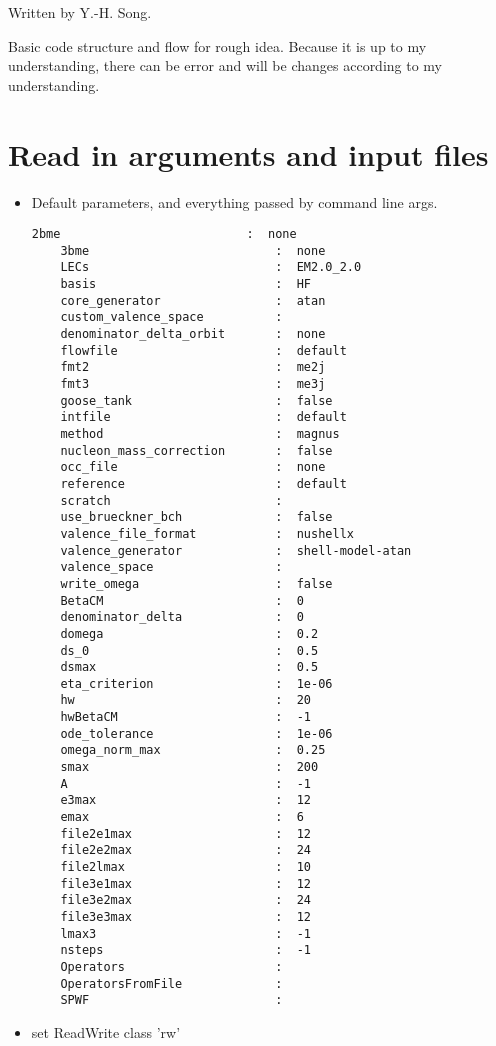 


Written by Y.-H. Song. 

Basic code structure and flow for rough idea. 
Because it is up to my understanding, there can be error
and will be changes according to my understanding. 

\section{Read in arguments and input files}
\begin{itemize}
 \item Default parameters, and everything passed by command line args.	
   \begin{lstlisting}[frame=single]
	2bme                          :  none
	3bme                          :  none
	LECs                          :  EM2.0_2.0
	basis                         :  HF
	core_generator                :  atan
	custom_valence_space          :  
	denominator_delta_orbit       :  none
	flowfile                      :  default
	fmt2                          :  me2j
	fmt3                          :  me3j
	goose_tank                    :  false
	intfile                       :  default
	method                        :  magnus
	nucleon_mass_correction       :  false
	occ_file                      :  none
	reference                     :  default
	scratch                       :  
	use_brueckner_bch             :  false
	valence_file_format           :  nushellx
	valence_generator             :  shell-model-atan
	valence_space                 :  
	write_omega                   :  false
	BetaCM                        :  0
	denominator_delta             :  0
	domega                        :  0.2
	ds_0                          :  0.5
	dsmax                         :  0.5
	eta_criterion                 :  1e-06
	hw                            :  20
	hwBetaCM                      :  -1
	ode_tolerance                 :  1e-06
	omega_norm_max                :  0.25
	smax                          :  200
	A                             :  -1
	e3max                         :  12
	emax                          :  6
	file2e1max                    :  12
	file2e2max                    :  24
	file2lmax                     :  10
	file3e1max                    :  12
	file3e2max                    :  24
	file3e3max                    :  12
	lmax3                         :  -1
	nsteps                        :  -1
	Operators                     :  
	OperatorsFromFile             :  
	SPWF                          :  
    \end{lstlisting}   
   \item set ReadWrite class 'rw' 
\end{itemize} 		

